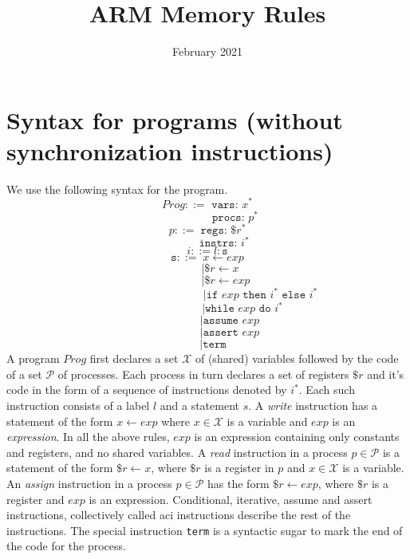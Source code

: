 \documentclass{article}
\title{ARM Memory Rules}
\date{February 2021}
\begin{document}
\maketitle
\section{Syntax for programs (without synchronization instructions)}


We use the following syntax for the program.
$$Prog ::= \texttt{ vars: }x^*$$
\vspace{-2em}
$$\qquad\qquad\quad\texttt{procs: }p^*$$
$$p ::= \;\texttt{regs: } \$r^*$$
\vspace{-2em}
$$\qquad\quad\texttt{instrs: }i^*$$
$$i ::= l:\texttt{s}$$
$$\texttt{s} ::= \;x \leftarrow exp$$ 
\vspace{-1.7em}
$$\qquad\;| \$r \leftarrow x $$
\vspace{-1.7em}
$$\qquad\quad\;| \$r \leftarrow exp$$
\vspace{-1.7em}
$$\qquad\qquad\qquad\qquad\quad\enspace|\texttt{if } exp \texttt{ then }i^* \texttt{ else }i^*$$
\vspace{-1.7em}
$$\qquad\qquad\qquad\;|\texttt{while } exp \texttt{ do }i^*$$
\vspace{-1.7em}
$$\qquad\qquad|\texttt{assume } exp$$
\vspace{-1.7em}
$$\qquad\qquad|\texttt{assert } exp$$
\vspace{-1.7em}
$$\quad|\texttt{term}$$
A program $Prog$ first declares a set $\mathcal{X}$ of (shared) variables followed by the code of a set $\mathcal{P}$ of processes. Each process in turn declares a set of registers $\$r$ and it's code in the form of a sequence of instructions denoted by $i^*$. Each such instruction consists of a label $l$ and a statement $s$. A \textit{write} instruction has a statement of the form $x \leftarrow exp$ where $x \in \mathcal{X}$ is a variable and $exp$ is an \textit{expression}. In all the above rules, $exp$ is an expression containing only constants and registers, and no shared variables. A \textit{read} instruction in a process $p \in \mathcal{P}$ is a statement of the form $\$r \leftarrow x$, where $\$r$ is a register in $p$ and $x \in \mathcal{X}$ is a variable. An \textit{assign} instruction in a process $p \in \mathcal{P}$ has the form $\$r \leftarrow exp$, where $\$r$ is a register and $exp$ is an expression. Conditional, iterative, assume and assert instructions, collectively called aci instructions describe the rest of the instructions. The special instruction \texttt{term} is a syntactic sugar to mark the end of the code for the process.
\vspace{-1em}
\end{document}
